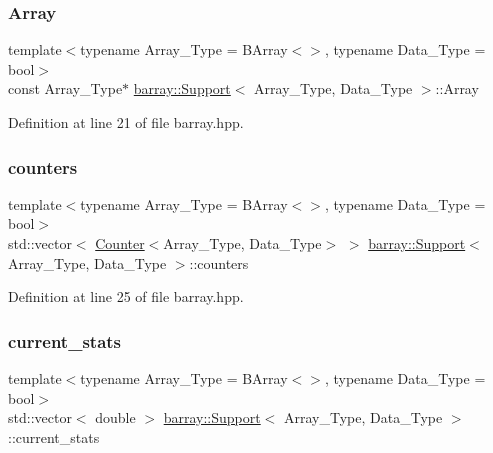 \subsubsection{\texorpdfstring{Array}{Array}}
{\footnotesize\ttfamily template$<$typename Array\+\_\+\+Type  = B\+Array$<$$>$, typename Data\+\_\+\+Type  = bool$>$ \\
const Array\+\_\+\+Type$\ast$ \hyperlink{classbarray_1_1_support}{barray\+::\+Support}$<$ Array\+\_\+\+Type, Data\+\_\+\+Type $>$\+::Array}



Definition at line 21 of file barray.\+hpp.

\mbox{\label{classbarray_1_1_support_a18c811739ff907dbc66e3f2c5152d495}} 
\subsubsection{\texorpdfstring{counters}{counters}}
{\footnotesize\ttfamily template$<$typename Array\+\_\+\+Type  = B\+Array$<$$>$, typename Data\+\_\+\+Type  = bool$>$ \\
std\+::vector$<$ \hyperlink{classbarray_1_1_counter}{Counter}$<$Array\+\_\+\+Type, Data\+\_\+\+Type$>$ $>$ \hyperlink{classbarray_1_1_support}{barray\+::\+Support}$<$ Array\+\_\+\+Type, Data\+\_\+\+Type $>$\+::counters}



Definition at line 25 of file barray.\+hpp.

\mbox{\label{classbarray_1_1_support_acb71d75c4f498aff69fe28323d3b6f66}} 
\subsubsection{\texorpdfstring{current\+\_\+stats}{current\_stats}}
{\footnotesize\ttfamily template$<$typename Array\+\_\+\+Type  = B\+Array$<$$>$, typename Data\+\_\+\+Type  = bool$>$ \\
std\+::vector$<$ double $>$ \hyperlink{classbarray_1_1_support}{barray\+::\+Support}$<$ Array\+\_\+\+Type, Data\+\_\+\+Type $>$\+::current\+\_\+stats}



